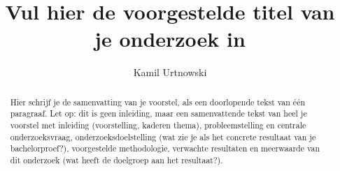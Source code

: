 \documentclass{hogent-article}
\title{Vul hier de voorgestelde titel van je onderzoek in}
\author{Kamil Urtnowski}
\begin{document}
\begin{abstract}
  Hier schrijf je de samenvatting van je voorstel, als een doorlopende tekst van één paragraaf. Let op: dit is geen inleiding, maar een samenvattende tekst van heel je voorstel met inleiding (voorstelling, kaderen thema), probleemstelling en centrale onderzoeksvraag, onderzoeksdoelstelling (wat zie je als het concrete resultaat van je bachelorproef?), voorgestelde methodologie, verwachte resultaten en meerwaarde van dit onderzoek (wat heeft de doelgroep aan het resultaat?).
\end{abstract}

\tableofcontents



\printbibliography[heading=bibintoc]
\end{document}
